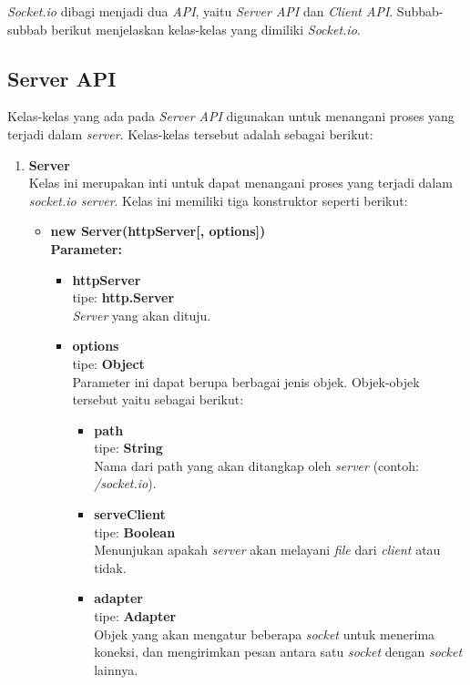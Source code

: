 \textit{Socket.io} dibagi menjadi dua \textit{API}, yaitu \textit{Server API} dan \textit{Client API}. Subbab-subbab berikut menjelaskan kelas-kelas yang dimiliki \textit{Socket.io}.

\subsection{Server API}
Kelas-kelas yang ada pada \textit{Server API} digunakan untuk menangani proses yang terjadi dalam \textit{server}\cite{socketioserver}. Kelas-kelas tersebut adalah sebagai berikut:

\begin{enumerate}
	\item \textbf{Server} \\ 
	Kelas ini merupakan inti untuk dapat menangani proses yang terjadi dalam \textit{socket.io server}. Kelas ini memiliki tiga konstruktor seperti berikut: 
	\begin{itemize}
		\item \textbf{new Server(httpServer[, options])} \\ 
		\textbf{Parameter:}
		\begin{itemize}
			\item \textbf{httpServer} \\ tipe: \textbf{http.Server} \\ \textit{Server} yang akan dituju.
			\item \textbf{options} \\ tipe: \textbf{Object} \\ Parameter ini dapat berupa berbagai jenis objek. Objek-objek tersebut yaitu sebagai berikut: 
			\begin{itemize}
				\item \textbf{path} \\ tipe: \textbf{String} \\ Nama dari path yang akan ditangkap oleh \textit{server} (contoh: \textit{/socket.io}).
				
				\item \textbf{serveClient} \\ tipe: \textbf{Boolean} \\ Menunjukan apakah \textit{server} akan melayani \textit{file} dari \textit{client} atau tidak.
				
				\item \textbf{adapter} \\ tipe: \textbf{Adapter} \\ Objek yang akan mengatur beberapa \textit{socket} untuk menerima koneksi, dan mengirimkan pesan antara satu \textit{socket} dengan \textit{socket} lainnya.
				

\end{itemize}
\end{itemize}
\end{itemize}
\end{enumerate}
